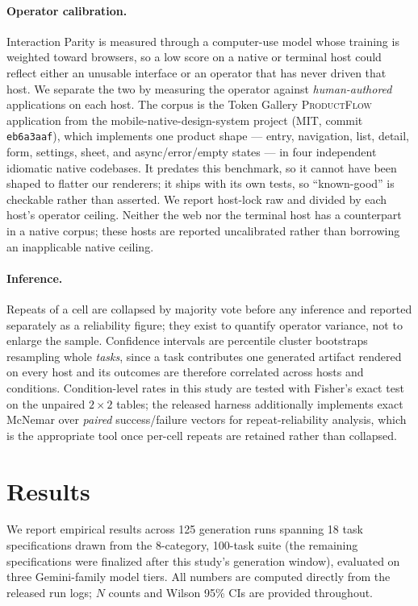 \documentclass{article}
\begin{document}
\paragraph{Operator calibration.}
Interaction Parity is measured through a computer-use model whose training is
weighted toward browsers, so a low score on a native or terminal host could
reflect either an unusable interface or an operator that has never driven that
host. We separate the two by measuring the operator against \emph{human-authored}
applications on each host. The corpus is the Token Gallery \textsc{ProductFlow}
application from the mobile-native-design-system project (MIT, commit
\texttt{eb6a3aaf}), which implements one product shape --- entry, navigation,
list, detail, form, settings, sheet, and async/error/empty states --- in four
independent idiomatic native codebases. It predates this benchmark, so it cannot
have been shaped to flatter our renderers; it ships with its own tests, so
``known-good'' is checkable rather than asserted. We report host-lock raw and
divided by each host's operator ceiling. Neither the web nor the terminal
host has a counterpart in a native corpus; these hosts are reported uncalibrated rather than borrowing an inapplicable native ceiling.

\paragraph{Inference.}
Repeats of a cell are collapsed by majority vote before any inference and
reported separately as a reliability figure; they exist to quantify operator
variance, not to enlarge the sample. Confidence intervals are percentile
cluster bootstraps resampling whole \emph{tasks}, since a task contributes one
generated artifact rendered on every host and its outcomes are therefore
correlated across hosts and conditions. Condition-level rates in this study
are tested with Fisher's exact test on the unpaired $2\times2$ tables; the
released harness additionally implements exact McNemar over \emph{paired}
success/failure vectors for repeat-reliability analysis, which is the
appropriate tool once per-cell repeats are retained rather than collapsed.

\section{Results}

We report empirical results across 125 generation runs spanning 18 task specifications drawn from the 8-category, 100-task suite (the remaining specifications were finalized after this study's generation window), evaluated on three Gemini-family model tiers. All numbers are computed directly from the released run logs; $N$ counts and Wilson 95\% CIs are provided throughout.
\end{document}
